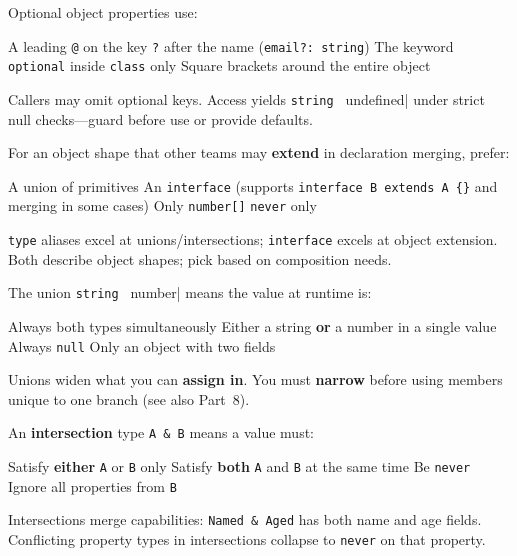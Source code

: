\question[4]
Optional object properties use:
\begin{choices}
  \choice A leading \texttt{@} on the key
  \CorrectChoice \lstinline[style=tsinline]|?| after the name (\lstinline[style=tsinline]|email?: string|)
  \choice The keyword \lstinline[style=tsinline]|optional| inside \lstinline[style=tsinline]|class| only
  \choice Square brackets around the entire object
\end{choices}
\begin{solution}
  Callers may omit optional keys. Access yields \lstinline[style=tsinline]|string | undefined| under strict null checks---guard before use or provide defaults.
\end{solution}

\question[4]
For an object shape that other teams may \textbf{extend} in declaration merging, prefer:
\begin{choices}
  \choice A union of primitives
  \CorrectChoice An \lstinline[style=tsinline]|interface| (supports \lstinline[style=tsinline]|interface B extends A {}| and merging in some cases)
  \choice Only \lstinline[style=tsinline]|number[]|
  \choice \lstinline[style=tsinline]|never| only
\end{choices}
\begin{solution}
  \lstinline[style=tsinline]|type| aliases excel at unions/intersections; \lstinline[style=tsinline]|interface| excels at object extension. Both describe object shapes; pick based on composition needs.
\end{solution}

\question[4]
The union \lstinline[style=tsinline]|string | number| means the value at runtime is:
\begin{choices}
  \choice Always both types simultaneously
  \CorrectChoice Either a string \textbf{or} a number in a single value
  \choice Always \lstinline[style=tsinline]|null|
  \choice Only an object with two fields
\end{choices}
\begin{solution}
  Unions widen what you can \textbf{assign in}. You must \textbf{narrow} before using members unique to one branch (see also Part~8).
\end{solution}

\question[4]
An \textbf{intersection} type \lstinline[style=tsinline]|A & B| means a value must:
\begin{choices}
  \choice Satisfy \textbf{either} \lstinline[style=tsinline]|A| or \lstinline[style=tsinline]|B| only
  \CorrectChoice Satisfy \textbf{both} \lstinline[style=tsinline]|A| and \lstinline[style=tsinline]|B| at the same time
  \choice Be \lstinline[style=tsinline]|never|
  \choice Ignore all properties from \lstinline[style=tsinline]|B|
\end{choices}
\begin{solution}
  Intersections merge capabilities: \lstinline[style=tsinline]|Named & Aged| has both name and age fields. Conflicting property types in intersections collapse to \lstinline[style=tsinline]|never| on that property.
\end{solution}

